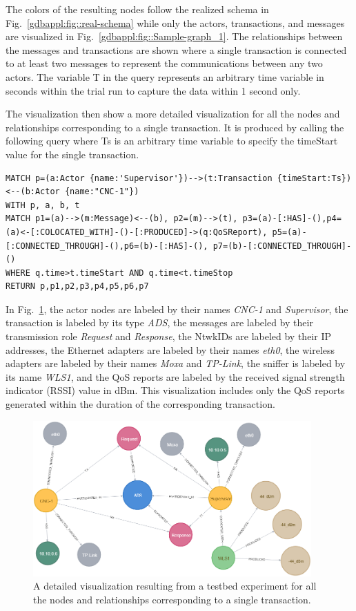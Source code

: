 The colors of the resulting nodes follow the realized schema in Fig.~\ref{gdbappl:fig::real-schema} while only the actors, transactions, and messages are visualized in Fig.~\ref{gdbappl:fig::Sample-graph_1}. The relationships between the messages and transactions are shown where a single transaction is connected to at least two messages to represent the communications between any two actors. The variable T in the query represents an arbitrary time variable in seconds within the trial run to capture the data within 1 second only.

The visualization then show a more detailed visualization for all the nodes and relationships corresponding to a single transaction. It is produced by calling the following query where Ts is an arbitrary time variable to specify the timeStart value for the single transaction. 

\begin{lstlisting}
MATCH p=(a:Actor {name:'Supervisor'})-->(t:Transaction {timeStart:Ts})<--(b:Actor {name:"CNC-1"})
WITH p, a, b, t
MATCH p1=(a)-->(m:Message)<--(b), p2=(m)-->(t), p3=(a)-[:HAS]-(),p4=(a)<-[:COLOCATED_WITH]-()-[:PRODUCED]->(q:QoSReport), p5=(a)-[:CONNECTED_THROUGH]-(),p6=(b)-[:HAS]-(), p7=(b)-[:CONNECTED_THROUGH]-()
WHERE q.time>t.timeStart AND q.time<t.timeStop
RETURN p,p1,p2,p3,p4,p5,p6,p7
\end{lstlisting}

In Fig.~\ref{gdbappl:fig::Sample-graph_2}, the actor nodes are labeled by their names \textit{CNC-1} and \textit{Supervisor}, the transaction is labeled by its type \textit{ADS}, the messages are labeled by their transmission role \textit{Request} and \textit{Response}, the NtwkIDs are labeled by their IP addresses, the Ethernet adapters are labeled by their names \textit{eth0}, the wireless adapters are labeled by their names \textit{Moxa} and \textit{TP-Link}, the sniffer is labeled by its name \textit{WLS1}, and the QoS reports are labeled by the received signal strength indicator (RSSI) value in dBm. This visualization includes only the QoS reports generated within the duration of the corresponding transaction.   

\begin{figure}[!ht]
    \centering
    \includegraphics[width=0.95\textwidth]{./chapter-gdb-appl/figures/database/graph_Single_trans.png}
    \caption{A detailed visualization resulting from a testbed experiment for all the nodes and relationships corresponding to a single transaction. }
    \label{gdbappl:fig::Sample-graph_2}
\end{figure}

